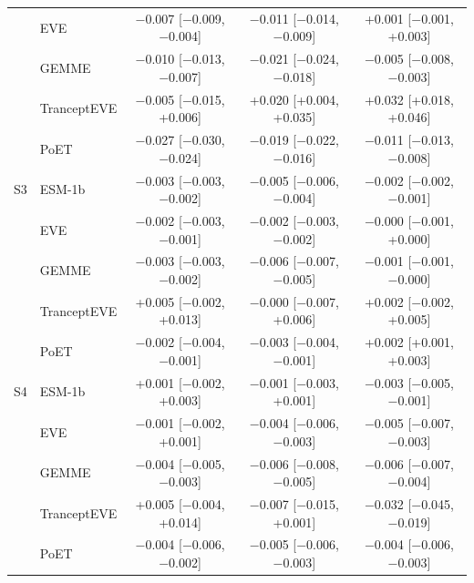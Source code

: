\begin{tabular}{llccc}
 & EVE & $-$0.007 [$-$0.009, $-$0.004] & $-$0.011 [$-$0.014, $-$0.009] & +0.001 [$-$0.001, +0.003] \\
 & GEMME & $-$0.010 [$-$0.013, $-$0.007] & $-$0.021 [$-$0.024, $-$0.018] & $-$0.005 [$-$0.008, $-$0.003] \\
 & TranceptEVE & $-$0.005 [$-$0.015, +0.006] & +0.020 [+0.004, +0.035] & +0.032 [+0.018, +0.046] \\
 & PoET & $-$0.027 [$-$0.030, $-$0.024] & $-$0.019 [$-$0.022, $-$0.016] & $-$0.011 [$-$0.013, $-$0.008] \\
\midrule
S3 & ESM-1b & $-$0.003 [$-$0.003, $-$0.002] & $-$0.005 [$-$0.006, $-$0.004] & $-$0.002 [$-$0.002, $-$0.001] \\
 & EVE & $-$0.002 [$-$0.003, $-$0.001] & $-$0.002 [$-$0.003, $-$0.002] & $-$0.000 [$-$0.001, +0.000] \\
 & GEMME & $-$0.003 [$-$0.003, $-$0.002] & $-$0.006 [$-$0.007, $-$0.005] & $-$0.001 [$-$0.001, $-$0.000] \\
 & TranceptEVE & +0.005 [$-$0.002, +0.013] & $-$0.000 [$-$0.007, +0.006] & +0.002 [$-$0.002, +0.005] \\
 & PoET & $-$0.002 [$-$0.004, $-$0.001] & $-$0.003 [$-$0.004, $-$0.001] & +0.002 [+0.001, +0.003] \\
\midrule
S4 & ESM-1b & +0.001 [$-$0.002, +0.003] & $-$0.001 [$-$0.003, +0.001] & $-$0.003 [$-$0.005, $-$0.001] \\
 & EVE & $-$0.001 [$-$0.002, +0.001] & $-$0.004 [$-$0.006, $-$0.003] & $-$0.005 [$-$0.007, $-$0.003] \\
 & GEMME & $-$0.004 [$-$0.005, $-$0.003] & $-$0.006 [$-$0.008, $-$0.005] & $-$0.006 [$-$0.007, $-$0.004] \\
 & TranceptEVE & +0.005 [$-$0.004, +0.014] & $-$0.007 [$-$0.015, +0.001] & $-$0.032 [$-$0.045, $-$0.019] \\
 & PoET & $-$0.004 [$-$0.006, $-$0.002] & $-$0.005 [$-$0.006, $-$0.003] & $-$0.004 [$-$0.006, $-$0.003] \\
\bottomrule
\end{tabular}
